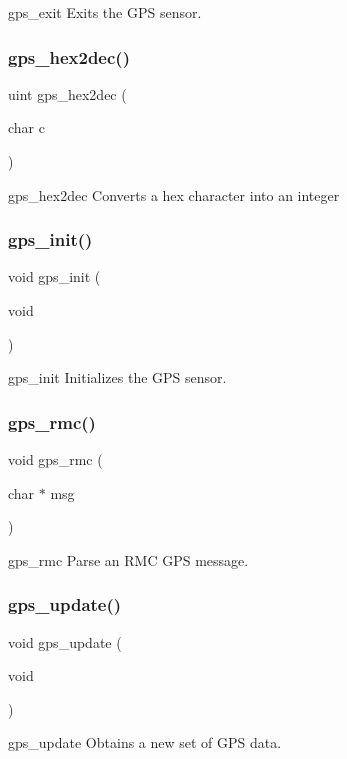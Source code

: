 gps\+\_\+exit Exits the G\+PS sensor. \mbox{\label{gps_8c_ad2a567fd990d296c23fe34aa09dd57e5}} 
\subsubsection{gps\+\_\+hex2dec()}
{\footnotesize\ttfamily uint gps\+\_\+hex2dec (\begin{DoxyParamCaption}\item[{char}]{c }\end{DoxyParamCaption})}

gps\+\_\+hex2dec Converts a hex character into an integer \mbox{\label{gps_8c_ab37f7040b9efd19fdd3f92b1df77e771}} 
\subsubsection{gps\+\_\+init()}
{\footnotesize\ttfamily void gps\+\_\+init (\begin{DoxyParamCaption}\item[{void}]{ }\end{DoxyParamCaption})}

gps\+\_\+init Initializes the G\+PS sensor. \mbox{\label{gps_8c_a3b6eeec7cc2b85bb68cac05c5973e190}} 
\subsubsection{gps\+\_\+rmc()}
{\footnotesize\ttfamily void gps\+\_\+rmc (\begin{DoxyParamCaption}\item[{char $\ast$}]{msg }\end{DoxyParamCaption})}

gps\+\_\+rmc Parse an R\+MC G\+PS message. \mbox{\label{gps_8c_a89ec0a415f4e2f9f100bc9b44daca279}} 
\subsubsection{gps\+\_\+update()}
{\footnotesize\ttfamily void gps\+\_\+update (\begin{DoxyParamCaption}\item[{void}]{ }\end{DoxyParamCaption})}

gps\+\_\+update Obtains a new set of G\+PS data. 
